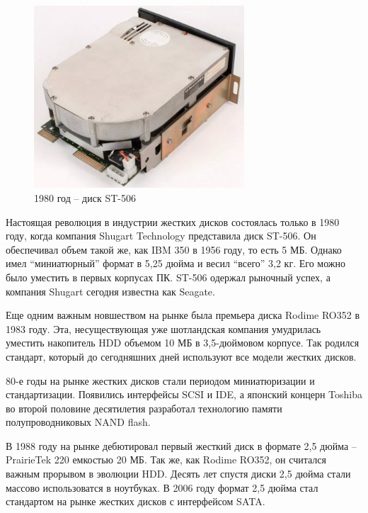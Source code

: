 \documentclass[bachelor, och, referat]{SCWorks}
\begin{document}
\begin{figure}[H]
    \centering
    \includegraphics[width=0.7\textwidth]{st506.png}
    \caption{1980 год -- диск ST-506}
    \label{}
\end{figure}

Настоящая революция в индустрии жестких дисков состоялась только в 1980 году, 
когда компания Shugart Technology представила диск ST-506. Он обеспечивал объем 
такой же, как IBM 350 в 1956 году, то есть 5 МБ. Однако имел ``миниатюрный'' 
формат в 5,25 дюйма и весил ``всего'' 3,2 кг. Его можно было уместить в первых 
корпусах ПК. ST-506 одержал рыночный успех, а компания Shugart сегодня известна 
как Seagate.

Еще одним важным новшеством на рынке была премьера диска Rodime RO352 в 1983 
году. Эта, несуществующая уже шотландская компания умудрилась уместить 
накопитель HDD объемом 10 МБ в 3,5-дюймовом корпусе. Так родился стандарт, 
который до сегодняшних дней используют все модели жестких дисков.

80-е годы на рынке жестких дисков стали периодом миниатюризации и 
стандартизации. Появились интерфейсы SCSI и IDE, а японский концерн Toshiba во 
второй половине десятилетия разработал технологию памяти полупроводниковых 
NAND flash.

В 1988 году на рынке дебютировал первый жесткий диск в формате 2,5 дюйма -- 
PrairieTek 220 емкостью 20 МБ. Так же, как Rodime RO352, он считался важным 
прорывом в эволюции HDD. Десять лет спустя диски 2,5 дюйма стали массово 
использоватся в ноутбуках. В 2006 году формат 2,5 дюйма стал стандартом на рынке
жестких дисков с интерфейсом SATA.
\end{document}
